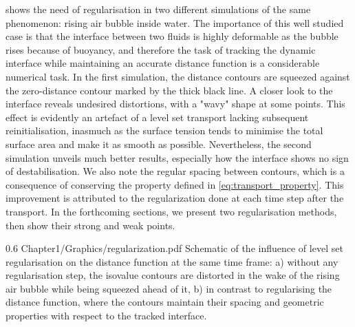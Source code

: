  shows the need of regularisation in two different 
simulations of the same phenomenon: rising air bubble inside
water. The importance of this well studied case \citep{sussman_level_1994,hysing_quantitative_2009}
is that the interface between two fluids is highly deformable
as the bubble rises because of buoyancy, and therefore the task of tracking the 
dynamic interface while maintaining an accurate distance function
is a considerable numerical task. In the first simulation, the distance contours 
are squeezed against the zero-distance contour marked by the 
thick black line. A closer look to the interface reveals undesired distortions, with a 
"wavy" shape at some points. This effect is evidently an artefact
of a level set transport lacking subsequent reinitialisation, inasmuch 
as the surface tension tends to minimise the total surface area and make it as smooth
as possible. Nevertheless, the second simulation unveils much better results, especially 
how the interface shows no sign of destabilisation. We also note the regular spacing between contours,
which is a consequence of conserving the property defined in \cref{eq:transport_property}.
This improvement is attributed to the regularization done at each time step after the transport.
In the forthcoming sections, we present two regularisation methods, then show their strong and weak points.
\begin{figureth}
{0.6}
{Chapter1/Graphics/regularization.pdf}
{Schematic of the influence of level set regularisation on the distance function at the same time frame: 
a) without any regularisation step, the isovalue contours are distorted in the wake of the rising air 
bubble while being squeezed ahead of it, 
b) in contrast to regularising the distance function, where the contours maintain their spacing and geometric 
properties with respect to the tracked interface.}
\label{fig:reinit_influence}
\end{figureth}
%
